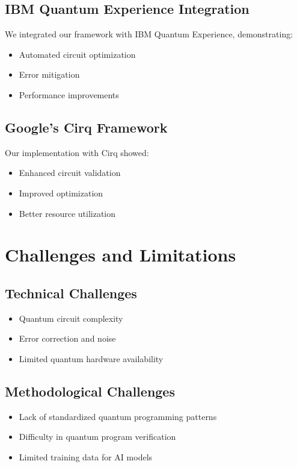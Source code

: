 \documentclass[10pt,twocolumn]{article}
\begin{document}
\subsection{IBM Quantum Experience Integration}
We integrated our framework with IBM Quantum Experience, demonstrating:
\begin{itemize}[leftmargin=*]
    \item Automated circuit optimization
    \item Error mitigation
    \item Performance improvements
\end{itemize}

\subsection{Google's Cirq Framework}
Our implementation with Cirq showed:
\begin{itemize}[leftmargin=*]
    \item Enhanced circuit validation
    \item Improved optimization
    \item Better resource utilization
\end{itemize}

\section{Challenges and Limitations}
\subsection{Technical Challenges}
\begin{itemize}[leftmargin=*]
    \item Quantum circuit complexity
    \item Error correction and noise
    \item Limited quantum hardware availability
\end{itemize}

\subsection{Methodological Challenges}
\begin{itemize}[leftmargin=*]
    \item Lack of standardized quantum programming patterns
    \item Difficulty in quantum program verification
    \item Limited training data for AI models
\end{itemize}
\end{document}
